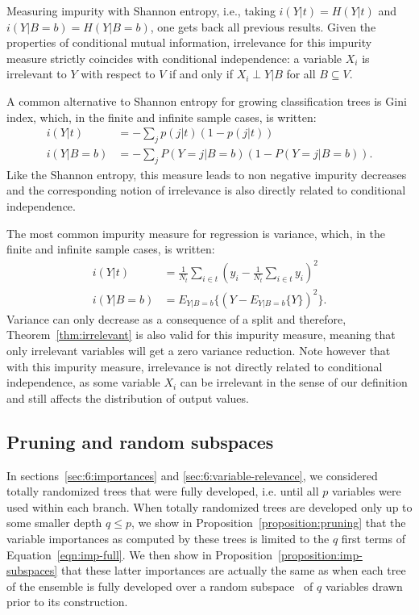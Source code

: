 Measuring impurity with Shannon entropy, i.e., taking $i(Y|t)=H(Y|t)$
and $i(Y|B=b)=H(Y|B=b)$, one gets back all previous results. Given the
properties of conditional mutual information, irrelevance for this
impurity measure strictly coincides with conditional independence: a
variable $X_i$ is irrelevant to $Y$ with respect to $V$ if and only if
$X_i\perp Y|B$ for all $B\subseteq V$.

A common alternative to Shannon entropy for growing classification
trees is Gini index, which, in the finite and infinite
sample cases, is written:
\begin{align}
i(Y|t)&= -\sum_j p(j|t) (1-p(j|t))\\
i(Y|B=b)&= -\sum_j P(Y=j|B=b) (1-P(Y=j|B=b)).
\end{align}
Like the Shannon entropy, this measure leads to non negative impurity
decreases and the corresponding notion of irrelevance is also directly
related to conditional independence.

The most common impurity measure for regression is variance, which, in
the finite and infinite sample cases, is written:
\begin{align}
i(Y|t)&=\frac{1}{N_t} \sum_{i\in t} (y_i-\frac{1}{N_t} \sum_{i\in t} y_i)^2\\
i(Y|B=b)&=E_{Y|B=b}\{(Y-E_{Y|B=b}\{Y\})^2\}.
\end{align}
Variance can only decrease as a consequence of a split and therefore,
Theorem~\ref{thm:irrelevant} is also valid for this impurity measure,
meaning that only irrelevant variables will get a zero variance
reduction. Note however that with this impurity measure, irrelevance
is not directly related to conditional independence, as some variable
$X_i$ can be irrelevant in the sense of our definition and still
affects the distribution of output values.


\subsection{Pruning and random subspaces}

In sections~\ref{sec:6:importances} and \ref{sec:6:variable-relevance}, we
considered totally randomized trees that were fully developed, i.e. until all
$p$ variables were used within each branch. When totally randomized trees are
developed only up to some smaller depth $q \leq p$, we show in
Proposition~\ref{proposition:pruning} that the variable importances as computed
by these trees is limited to the $q$ first terms of Equation~\ref{eqn:imp-full}.
We then show in Proposition~\ref{proposition:imp-subspaces} that these
latter importances are actually the same as when each tree of the ensemble is
fully developed over a random subspace~\citep{ho:1998} of $q$ variables
drawn prior to its construction.

